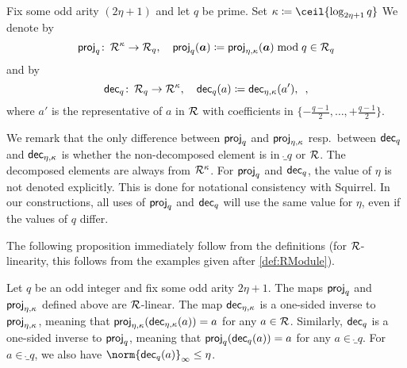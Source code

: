 %
\begin{definition}\label{def:proj_decomp_q}
Fix some odd arity $(2\eta+1)$ and let $q$ be prime.
Set $\limbs \coloneqq \ceil{\log_{2\eta+1}q}$
We denote by
\[
 \mathsf{proj}_{q}\colon\,\mathcal{R}^\kappa \to \mathcal{R}_q,\quad \mathsf{proj}_{q}(\boldsymbol{a}) \coloneqq \mathsf{proj}_{\eta,\kappa}(\boldsymbol{a})\bmod q\in\mathcal{R}_q
\]
and by
\[
 \mathsf{dec}_{q}\colon\,\mathcal{R}_q \to \mathcal{R}^\kappa,\quad \mathsf{dec}_{q}(a) \coloneqq \mathsf{dec}_{\eta,\kappa}(a'),\enspace,
\]
where $a'$ is the representative of $a$ in $\mathcal{R}$ with coefficients in $\{-\frac{q-1}{2},\ldots,+\frac{q-1}{2}\}$.
\end{definition}
We remark that the only difference between $\mathsf{proj}_{q}$ and $\mathsf{proj}_{\eta,\kappa}$ resp.\ between $\mathsf{dec}_{q}$ and $\mathsf{dec}_{\eta,\kappa}$ is whether the non-decomposed element is in $\ring_q$ or $\mathcal{R}$.
The decomposed elements are always from $\mathcal{R}^\kappa$.
For $\mathsf{proj}_{q}$ and $\mathsf{dec}_{q}$, the value of $\eta$ is not denoted explicitly.
This is done for notational consistency with Squirrel.
In our constructions, all uses of $\mathsf{proj}_{q}$ and $\mathsf{dec}_{q}$ will use the same value for $\eta$, even if the values of $q$ differ.


The following proposition immediately follow from the definitions (for $\mathcal{R}$-linearity, this follows from the examples given after \autoref{def:RModule}).
\begin{proposition}\label{prop:projanddecomp}
Let $q$ be an odd integer and fix some odd arity $2\eta+1$. The maps $\mathsf{proj}_{q}$ and $\mathsf{proj}_{\eta,\kappa}$ defined above are $\mathcal{R}$-linear.
The map $\mathsf{dec}_{\eta,\kappa}$ is a one-sided inverse to $\mathsf{proj}_{\eta,\kappa}$, meaning that $\mathsf{proj}_{\eta,\kappa}(\mathsf{dec}_{\eta,\kappa}(a)) = a$ for any $a\in\mathcal{R}$.
Similarly, $\mathsf{dec}_{q}$ is a one-sided inverse to $\mathsf{proj}_{q}$, meaning that $\mathsf{proj}_{q}(\mathsf{dec}_{q}(a))= a$ for any $a\in\ring_q$.
For $a\in\ring_q$, we also have $\norm{\decompmod{q}(a)}_{\infty} \leq \eta$.
\end{proposition}

